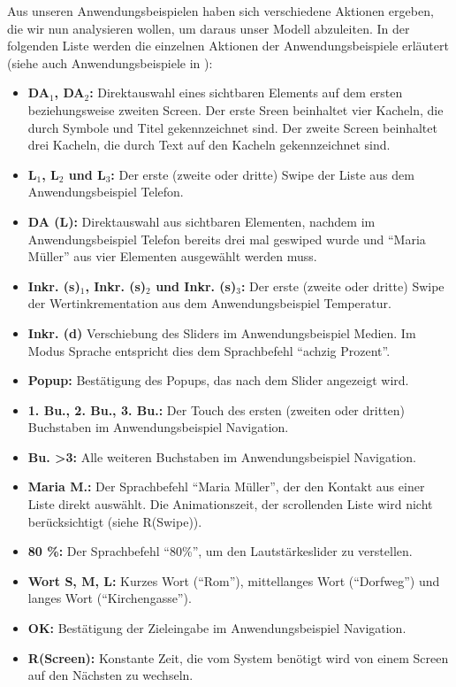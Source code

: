 Aus unseren Anwendungsbeispielen haben sich verschiedene Aktionen ergeben, die wir nun analysieren wollen, um daraus unser Modell abzuleiten.
In der folgenden Liste werden die einzelnen Aktionen der Anwendungsbeispiele erläutert (siehe auch Anwendungsbeispiele in ):
\begin{itemize}
	\item \textbf{DA$_1$, DA$_2$:} Direktauswahl eines sichtbaren Elements auf dem ersten beziehungsweise zweiten Screen.
	Der erste Sreen beinhaltet vier Kacheln, die durch Symbole und Titel gekennzeichnet sind.
	Der zweite Screen beinhaltet drei Kacheln, die durch Text auf den Kacheln gekennzeichnet sind.
	\item \textbf{L$_1$, L$_2$ und L$_3$:} Der erste (zweite oder dritte) Swipe der Liste aus dem Anwendungsbeispiel Telefon.
	\item \textbf{DA (L):} Direktauswahl aus sichtbaren Elementen, nachdem im Anwendungsbeispiel Telefon bereits drei mal geswiped wurde und "`Maria Müller"' aus vier Elementen ausgewählt werden muss.
	\item \textbf{Inkr. (s)$_1$, Inkr. (s)$_2$ und Inkr. (s)$_3$:} Der erste (zweite oder dritte) Swipe der Wertinkrementation aus dem Anwendungsbeispiel Temperatur.
	\item \textbf{Inkr. (d)} Verschiebung des Sliders im Anwendungsbeispiel Medien.
	Im Modus Sprache entspricht dies dem Sprachbefehl "`achzig Prozent"'.
	\item \textbf{Popup:} Bestätigung des Popups, das nach dem Slider angezeigt wird.
	\item \textbf{1. Bu., 2. Bu., 3. Bu.:} Der Touch des ersten (zweiten oder dritten) Buchstaben im Anwendungsbeispiel Navigation.
	\item \textbf{Bu. >3:} Alle weiteren Buchstaben im Anwendungsbeispiel Navigation.
  \item \textbf{Maria M.:} Der Sprachbefehl "`Maria Müller"', der den Kontakt aus einer Liste direkt auswählt.
  Die Animationszeit, der scrollenden Liste wird nicht berücksichtigt (siehe R(Swipe)).
	\item \textbf{80 \%:} Der Sprachbefehl "`80\%"', um den Lautstärkeslider zu verstellen.
	\item \textbf{Wort S, M, L:} Kurzes Wort ("`Rom"'), mittellanges Wort ("`Dorfweg"') und langes Wort ("`Kirchengasse"').
	\item \textbf{OK:} Bestätigung der Zieleingabe im Anwendungsbeispiel Navigation.
	\item \textbf{R(Screen):} Konstante Zeit, die vom System benötigt wird von einem Screen auf den Nächsten zu wechseln.

\end{itemize}
